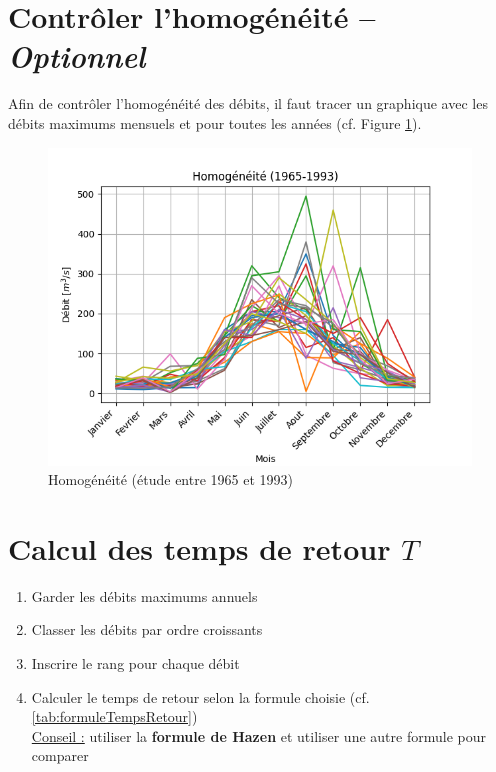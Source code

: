 \section{Contrôler l'homogénéité -- \textit{Optionnel}}
Afin de contrôler l'homogénéité des débits, il faut tracer un graphique avec les débits maximums mensuels et pour toutes les années (cf. Figure \ref{graph:homogeneite}).
\begin{figure}[H]
    \centering
    \includegraphics[width=12cm]{homogeneite.png}
    \caption{Homogénéité (étude entre 1965 et 1993)}
    \label{graph:homogeneite}
\end{figure}


\section{Calcul des temps de retour $T$}
\begin{enumerate}
    \item Garder les débits maximums annuels
    \item Classer les débits par ordre croissants
    \item Inscrire le rang pour chaque débit
    \item Calculer le temps de retour selon la formule choisie (cf. \ref{tab:formuleTempsRetour}) \\
    \underline{Conseil :} utiliser la \textbf{{\color{red} formule de Hazen}} et utiliser une autre formule pour comparer
\end{enumerate}



